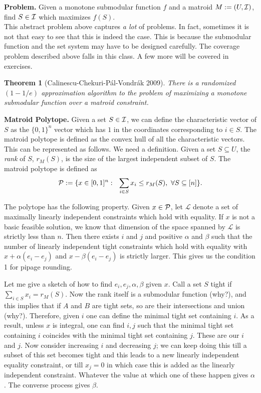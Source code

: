 \documentclass[11pt]{article}
\newtheorem{theorem}{Theorem}
\def\script#1{\mathcal{#1}}
\begin{document}
\noindent
{\bf Problem.} Given a monotone submodular function $f$ and a matroid $M := (U,\I)$, find $S\in \I$ which maximizes $f(S)$. \\

This abstract problem above captures {\em a lot} of problems. In fact, sometimes it is not that easy to see that this is indeed the case. This is because the submodular function and the set system may have to be designed carefully. The coverage problem described above falls in this class. A few more will be covered in exercises.

\begin{theorem}[Calinescu-Chekuri-P\'al-Vondr\'ak 2009]
There is a randomized $(1-1/e)$ approximation algorithm to the problem of maximizing a monotone submodular function over a matroid constraint.
\end{theorem}
\noindent
{\bf Matroid Polytope.} Given a set $S\in \I$, we can define the characteristic vector of $S$ as the $\{0,1\}^n$ vector which has $1$ in the coordinates corresponding to $i\in S$. The matroid polytope is defined as the convex hull of all the characteristic vectors. This can be represented as follows. We need a definition. Given a set $S\subseteq U$, the {\em rank} of $S$, $r_M(S)$, is the size of the largest independent subset of $S$. 
The matroid polytope is defined as 
$$\P := \{x\in [0,1]^n: ~~ \sum_{i\in S} x_i \le r_M(S), ~\forall S\subseteq [n]\}.$$

\noindent
The polytope has the following property. Given $x\in \P$, let $\script{L}$ denote a set of maximally linearly independent constraints which hold with equality. If $x$ is not a basic feasible solution, we know that dimension of the space spanned by $\script{L}$ is strictly less than $n$. Then there exists $i$ and $j$ and positive $\alpha$ and $\beta$ such that the number of linearly independent tight constraints which hold with equality with $x + \alpha(e_i - e_j)$ and $x - \beta(e_i - e_j)$ is strictly larger. This gives us the condition 1 for pipage rounding.


Let me give a sketch of how to find $e_i,e_j,\alpha,\beta$ given $x$. Call a set $S$ tight if $\sum_{i\in S}x_i = r_M(S)$. Now the rank itself is a submodular function (why?), and this implies that if $A$ and $B$ are tight
sets, so are their intersections and union (why?). Therefore, given $i$ one can define the minimal tight set containing $i$. As a result, unless $x$ is integral, one can find $i,j$ such that the minimal tight set containing $i$ coincides with the minimal tight set containing $j$. These are our $i$ and $j$. Now consider increasing $i$ and decreasing $j$; we can keep doing this till a subset of this set becomes tight and this leads to a new linearly independent equality constraint, or till $x_j = 0$ in which case this is added as the linearly independent constraint. Whatever the value at which one of these happen gives $\alpha$. The converse process gives $\beta$. \\
\end{document}
